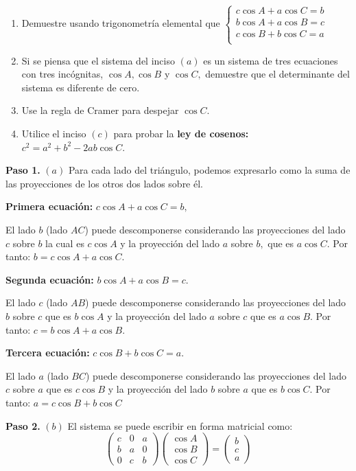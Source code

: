 \begin{example}
\begin{enumerate}[$(a)$]
\item Demuestre usando trigonometría elemental que $\begin{cases}
c\cos A + a\cos C =b\\
b\cos A + a\cos B =c\\
 c\cos B + b\cos C=a\\
\end{cases}$
\item Si se piensa que el sistema del inciso $(a)$ es un sistema de tres ecuaciones con tres incógnitas, $\cos A, \cos B$ y $\cos C,$ demuestre que el determinante del sistema es diferente de cero.
\item Use la regla de Cramer para despejar $\cos C.$
\item Utilice el inciso $(c)$ para probar la \textbf{ley de cosenos:} $c^2=a^2+b^2-2ab\cos C.$
\end{enumerate}

\begin{myproof}
\textbf{Paso 1.} $(a)$ Para cada lado del triángulo, podemos expresarlo como la suma de las proyecciones de los otros dos lados sobre él.

\textbf{Primera ecuación:} $c\cos A + a\cos C = b,$

El lado $b$ (lado $AC$) puede descomponerse considerando las proyecciones del lado $c$ sobre $b$ la cual es $c\cos A$ y la proyección del lado $a$ sobre $b,$ que es $a\cos C.$ Por tanto: $b = c\cos A + a\cos C.$

\textbf{Segunda ecuación:} $b\cos A + a\cos B = c.$

El lado $c$ (lado $AB$) puede descomponerse considerando las proyecciones del lado $b$ sobre $c$ que es $b\cos A$ y la proyección del lado $a$ sobre $c$ que es $a\cos B.$ Por tanto: $c = b\cos A + a\cos B.$

\textbf{Tercera ecuación:} $c\cos B + b\cos C = a.$

El lado $a$ (lado $BC$) puede descomponerse considerando las proyecciones del lado $c$ sobre $a$ que es $c\cos B$ y la proyección del lado $b$ sobre $a$ que es $b\cos C.$ Por tanto: $a = c\cos B + b\cos C$

\textbf{Paso 2.} $(b)$ El sistema se puede escribir en forma matricial como:
\[\begin{pmatrix}
c & 0 & a \\
b & a & 0 \\
0 & c & b
\end{pmatrix}
\begin{pmatrix}
\cos A \\
\cos B \\
\cos C
\end{pmatrix}
=
\begin{pmatrix}
b \\
c \\
a
\end{pmatrix}\]


\end{myproof}
\end{example}
